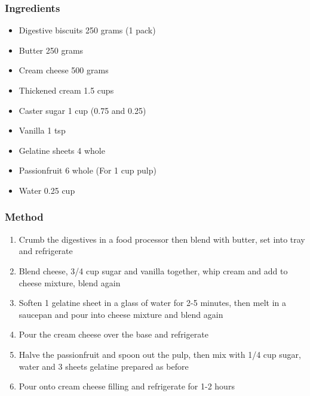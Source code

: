 \documentclass[]{article}
\begin{document}
\subsubsection*{\Large Ingredients}
\begin{multicols}{2}
\begin{itemize}
 \item Digestive biscuits \hfill 250 grams (1 pack)
 \item Butter \hfill 250 grams
 \item Cream cheese \hfill 500 grams
 \item Thickened cream \hfill 1.5 cups
 \item Caster sugar \hfill 1 cup (0.75 and 0.25)
 \item Vanilla \hfill 1 tsp
 \item Gelatine sheets \hfill 4 whole
 \item Passionfruit \hfill 6 whole (For 1 cup pulp)
 \item Water \hfill 0.25 cup
\end{itemize}
\end{multicols}
\subsubsection*{\Large Method}
\begin{enumerate}[font=\huge\color{accent}]
	\item Crumb the digestives in a food processor then blend with butter, set into tray and refrigerate
	\item Blend cheese, 3/4 cup sugar and vanilla together, whip cream and add to cheese mixture, blend again
	\item Soften 1 gelatine sheet in a glass of water for 2-5 minutes, then melt in a saucepan and pour into cheese mixture and blend again
	\item Pour the cream cheese over the base and refrigerate
	\item Halve the passionfruit and spoon out the pulp, then mix with 1/4 cup sugar, water and 3 sheets gelatine prepared as before
	\item Pour onto cream cheese filling and refrigerate for 1-2 hours
\end{enumerate}
\newpage
{}\label{rec:Pavlova}
\end{document}
